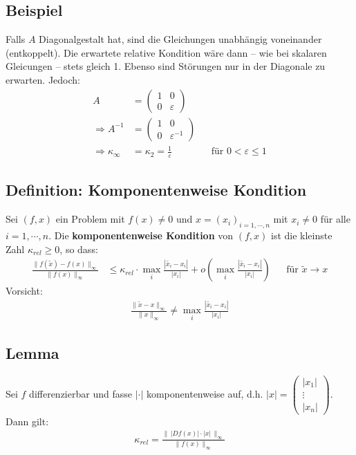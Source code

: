 \documentclass[ngerman,fontsize=11pt, paper=a4, parskip=half, titlepage=true, toc=bib]{scrbook}
\begin{document}
  \subsection{Beispiel}
  Falls $A$ Diagonalgestalt hat, sind die Gleichungen unabhängig voneinander (entkoppelt).
  Die erwartete relative Kondition wäre dann -- wie bei skalaren Gleicungen -- stets gleich 1.
  Ebenso sind Störungen nur in der Diagonale zu erwarten. Jedoch:
  \begin{align*}
    A  &=\begin{pmatrix}
      1 & 0\\
      0 & \varepsilon
    \end{pmatrix} \\
    \Rightarrow 	A^{-1}&=\begin{pmatrix}
      1 & 0\\
      0 & \varepsilon^{-1}
    \end{pmatrix}\\
    \Rightarrow \kappa_\infty& = \kappa_2 = \frac{1}{\varepsilon} 
        && \text{für }0 < \varepsilon \leq 1											
  \end{align*}

  \subsection{Definition: Komponentenweise Kondition}
  Sei $(f, x) $ ein Problem mit $f(x)\neq 0$ und $x=(x_i)_{i=1,\cdots , n}$ mit $x_i\neq 0 $  für alle $i=1,\cdots, n$.
  Die \textbf{komponentenweise Kondition} von $(f,x) $ ist die kleinste Zahl $\kappa_{rel}\geq 0$, so dass:
  \begin{align*}
    \frac{\|f(\widetilde{x})-f(x)\|_\infty}{\|f(x)\|_\infty} 
    &\leq \kappa_{rel} \cdot \underset{i}{\max}\frac{|\widetilde{x_i}-x_i|}{|x_i|}+ o\left(\underset{i}{\max}\frac{|\widetilde{x_i}-x_i|}{|x_i|}\right) 
    && \text{für }\widetilde{x}\rightarrow x
  \end{align*}
  Vorsicht:
  \begin{gather*}
    \frac{\|\widetilde{x}-x\|_\infty}{\|x\|_\infty}\neq \underset{i}{\max}\frac{|\widetilde{x_i}-x_i|}{|x_i|}
  \end{gather*}

  \subsection{Lemma} \label{3.2.17}
  Sei $f$ differenzierbar und fasse $|\cdot|$ komponentenweise auf, d.h. $|x| = \begin{pmatrix}
    |x_1| \\
    \vdots \\
    |x_n|
  \end{pmatrix}$.
  Dann gilt:
  \begin{gather}
    \kappa_{rel} = \frac{\|\, |Df(x)|\cdot |x| \, \|_\infty}{\|f(x)\|_\infty} \label{III.2.16}
  \end{gather}
\end{document}

